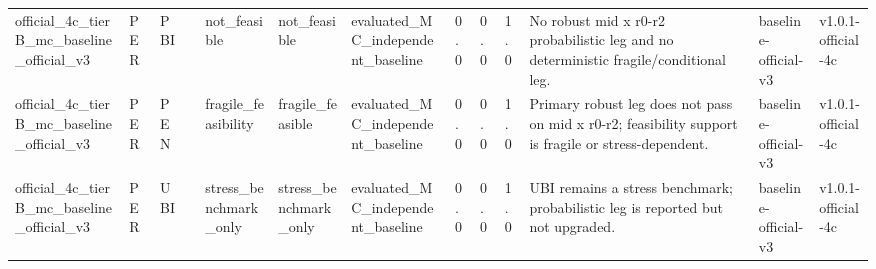 \begin{table}[!htbp]
\begin{tabular}{lllllllllllll}
official\_4c\_tierB\_mc\_baseline\_official\_v3 & PER & PBI &  & not\_feasible & not\_feasible & evaluated\_MC\_independent\_baseline & 0.0 & 0.0 & 1.0 & No robust mid x r0-r2 probabilistic leg and no deterministic fragile/conditional leg. & baseline-official-v3 & v1.0.1-official-4c \\
official\_4c\_tierB\_mc\_baseline\_official\_v3 & PER & PEN &  & fragile\_feasibility & fragile\_feasible & evaluated\_MC\_independent\_baseline & 0.0 & 0.0 & 1.0 & Primary robust leg does not pass on mid x r0-r2; feasibility support is fragile or stress-dependent. & baseline-official-v3 & v1.0.1-official-4c \\
official\_4c\_tierB\_mc\_baseline\_official\_v3 & PER & UBI &  & stress\_benchmark\_only & stress\_benchmark\_only & evaluated\_MC\_independent\_baseline & 0.0 & 0.0 & 1.0 & UBI remains a stress benchmark; probabilistic leg is reported but not upgraded. & baseline-official-v3 & v1.0.1-official-4c \\
\bottomrule
\end{tabular}
\end{table}

